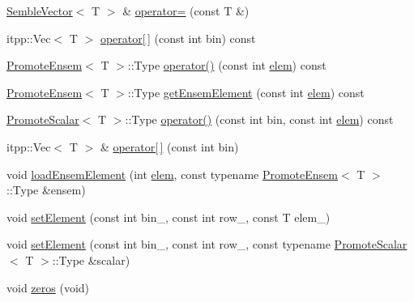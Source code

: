 \begin{DoxyCompactItemize}
\item 
\mbox{\hyperlink{structSEMBLE_1_1SembleVector}{Semble\+Vector}}$<$ T $>$ \& \mbox{\hyperlink{structSEMBLE_1_1SembleVector_a8c0ea68d6fb0bb148ce54b16028969b6}{operator=}} (const T \&)
\item 
itpp\+::\+Vec$<$ T $>$ \mbox{\hyperlink{structSEMBLE_1_1SembleVector_ac29f93351529fd38cd7fe34a8eb97837}{operator\mbox{[}$\,$\mbox{]}}} (const int bin) const
\item 
\mbox{\hyperlink{structSEMBLE_1_1PromoteEnsem}{Promote\+Ensem}}$<$ T $>$\+::Type \mbox{\hyperlink{structSEMBLE_1_1SembleVector_adc79020ae59d85061589bf64e27bf5be}{operator()}} (const int \mbox{\hyperlink{structSEMBLE_1_1SembleVector_a4054d66d607dbedd52f2d11cd9d1086c}{elem}}) const
\item 
\mbox{\hyperlink{structSEMBLE_1_1PromoteEnsem}{Promote\+Ensem}}$<$ T $>$\+::Type \mbox{\hyperlink{structSEMBLE_1_1SembleVector_a51b3272526cbc8cf3e84182e659df0e3}{get\+Ensem\+Element}} (const int \mbox{\hyperlink{structSEMBLE_1_1SembleVector_a4054d66d607dbedd52f2d11cd9d1086c}{elem}}) const
\item 
\mbox{\hyperlink{structSEMBLE_1_1PromoteScalar}{Promote\+Scalar}}$<$ T $>$\+::Type \mbox{\hyperlink{structSEMBLE_1_1SembleVector_a0e3c396d32b718a3deba78a6da167bf9}{operator()}} (const int bin, const int \mbox{\hyperlink{structSEMBLE_1_1SembleVector_a4054d66d607dbedd52f2d11cd9d1086c}{elem}}) const
\item 
itpp\+::\+Vec$<$ T $>$ \& \mbox{\hyperlink{structSEMBLE_1_1SembleVector_aabe4364148770aaf468bc91bb5d18ffa}{operator\mbox{[}$\,$\mbox{]}}} (const int bin)
\item 
void \mbox{\hyperlink{structSEMBLE_1_1SembleVector_acac507fe462d0c438a429128dfbf0eb1}{load\+Ensem\+Element}} (int \mbox{\hyperlink{structSEMBLE_1_1SembleVector_a4054d66d607dbedd52f2d11cd9d1086c}{elem}}, const typename \mbox{\hyperlink{structSEMBLE_1_1PromoteEnsem}{Promote\+Ensem}}$<$ T $>$\+::Type \&ensem)
\item 
void \mbox{\hyperlink{structSEMBLE_1_1SembleVector_ac0fe91a94d59588d817fb4e0f13fcc65}{set\+Element}} (const int bin\+\_\+, const int row\+\_\+, const T elem\+\_\+)
\item 
void \mbox{\hyperlink{structSEMBLE_1_1SembleVector_a0eeec0b9e7992933a309dde7b0d92b05}{set\+Element}} (const int bin\+\_\+, const int row\+\_\+, const typename \mbox{\hyperlink{structSEMBLE_1_1PromoteScalar}{Promote\+Scalar}}$<$ T $>$\+::Type \&scalar)
\item 
void \mbox{\hyperlink{structSEMBLE_1_1SembleVector_a17337e7001050f08298608379aa6504c}{zeros}} (void)

\end{DoxyCompactItemize}
